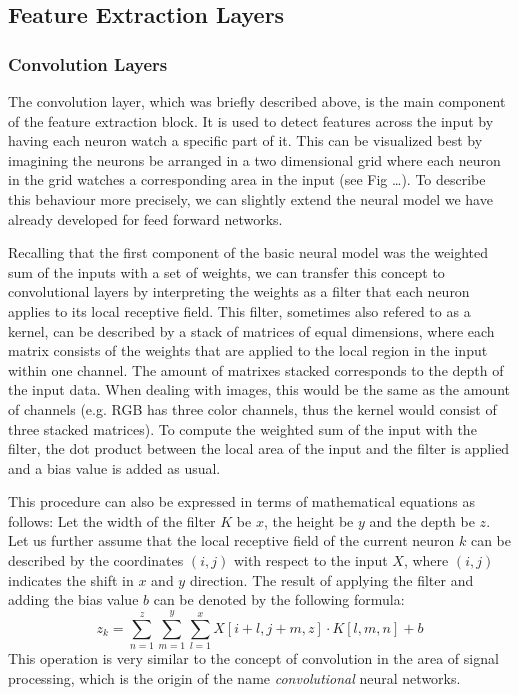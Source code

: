 \subsection{Feature Extraction Layers}

\subsubsection{Convolution Layers}

The convolution layer, which was briefly described above, is the main
component of the feature extraction block. It is used to detect
features across the input by having each neuron watch a specific part
of it. This can be visualized best by imagining the neurons be
arranged in a two dimensional grid where each neuron in the grid
watches a corresponding area in the input (see Fig \ldots). To describe
this behaviour more precisely, we can slightly extend the neural model
we have already developed for feed forward networks.

Recalling that the first component of the basic neural model was the
weighted sum of the inputs with a set of weights, we can transfer this
concept to convolutional layers by interpreting the weights as a
filter that each neuron applies to its local receptive field. This
filter, sometimes also refered to as a kernel, can be described by a
stack of matrices of equal dimensions, where each matrix consists of
the weights that are applied to the local region in the input within
one channel. The amount of matrixes stacked corresponds to the depth
of the input data. When dealing with images, this would be the same as
the amount of channels (e.g. RGB has three color channels, thus the
kernel would consist of three stacked matrices). To compute the
weighted sum of the input with the filter, the dot product between the
local area of the input and the filter is applied and a bias value is
added as usual.

This procedure can also be expressed in terms of mathematical
equations as follows: Let the width of the filter \(K\) be \(x\), the
height be \(y\) and the depth be \(z\). Let us further assume that the
local receptive field of the current neuron \(k\) can be described by
the coordinates \((i, j)\) with respect to the input \(X\), where
\((i, j)\) indicates the shift in \(x\) and \(y\) direction. The
result of applying the filter and adding the bias value \(b\) can be
denoted by the following formula:
\begin{equation}
  \label{Eq:convolution}
  z_k = \sum_{n=1}^{z}{\sum_{m=1}^{y}{\sum_{l=1}^{x}{X[i+l, j+m, z] \cdot
        K[l, m, n]}}} + b
\end{equation}
This operation is very similar to the concept of convolution in the
area of signal processing, which is the origin of the name
\textit{convolutional} neural networks.

